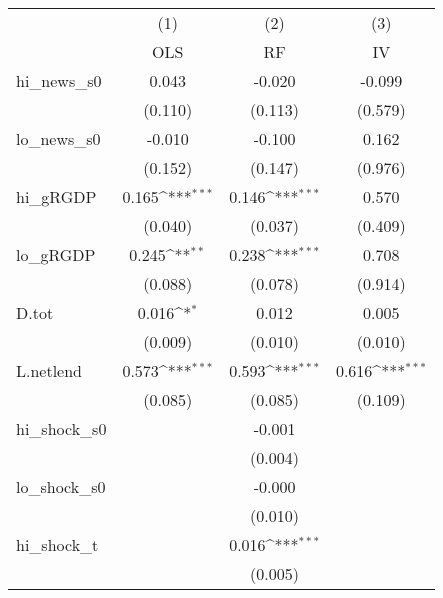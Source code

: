{
\def\sym#1{\ifmmode^{#1}\else\(^{#1}\)\fi}
\begin{tabular}{l*{3}{c}}
\toprule
            &\multicolumn{1}{c}{(1)}&\multicolumn{1}{c}{(2)}&\multicolumn{1}{c}{(3)}\\
            &\multicolumn{1}{c}{OLS}&\multicolumn{1}{c}{RF}&\multicolumn{1}{c}{IV}\\
\midrule
hi\_news\_s0  &       0.043         &      -0.020         &      -0.099         \\
            &     (0.110)         &     (0.113)         &     (0.579)         \\
\addlinespace
lo\_news\_s0  &      -0.010         &      -0.100         &       0.162         \\
            &     (0.152)         &     (0.147)         &     (0.976)         \\
\addlinespace
hi\_gRGDP    &       0.165\sym{***}&       0.146\sym{***}&       0.570         \\
            &     (0.040)         &     (0.037)         &     (0.409)         \\
\addlinespace
lo\_gRGDP    &       0.245\sym{**} &       0.238\sym{***}&       0.708         \\
            &     (0.088)         &     (0.078)         &     (0.914)         \\
\addlinespace
D.tot       &       0.016\sym{*}  &       0.012         &       0.005         \\
            &     (0.009)         &     (0.010)         &     (0.010)         \\
\addlinespace
L.netlend   &       0.573\sym{***}&       0.593\sym{***}&       0.616\sym{***}\\
            &     (0.085)         &     (0.085)         &     (0.109)         \\
\addlinespace
hi\_shock\_s0 &                     &      -0.001         &                     \\
            &                     &     (0.004)         &                     \\
\addlinespace
lo\_shock\_s0 &                     &      -0.000         &                     \\
            &                     &     (0.010)         &                     \\
\addlinespace
hi\_shock\_t  &                     &       0.016\sym{***}&                     \\
            &                     &     (0.005)         &                     \\

\end{tabular}}
